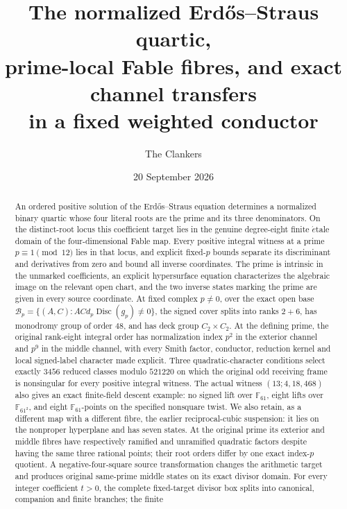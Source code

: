\documentclass[11pt]{article}
\title{The normalized Erd\H{o}s--Straus quartic,\\
prime-local Fable fibres, and exact channel transfers\\
in a fixed weighted conductor}
\author{The Clankers}
\date{20 September 2026}
\theoremstyle{definition}\newtheorem{definition}[theorem]{Definition}
\theoremstyle{remark}\newtheorem{remark}[theorem]{Remark}
\newcommand{\Disc}{\operatorname{Disc}}
\begin{document}
\maketitle

\begin{abstract}
An ordered positive solution of the Erd\H{o}s--Straus equation determines a
normalized binary quartic whose four literal roots are the prime and its three
denominators.  On the distinct-root locus this coefficient target lies in the
genuine degree-eight finite \(\acute{e}\)tale domain of the four-dimensional
Fable map.  Every positive integral witness at a prime
\(p\equiv1\pmod {12}\) lies in that locus, and explicit fixed-\(p\) bounds
separate its discriminant and derivatives from zero and bound all inverse
coordinates.
The prime is intrinsic in the unmarked coefficients, an explicit hypersurface
equation characterizes the algebraic image on the relevant open chart, and
the two inverse states marking the prime are given in every source coordinate.
At fixed complex \(p\ne0\), over the exact open base
\(\mathcal B_p=\{(A,C):ACd_p\Disc(g_p)\ne0\}\), the signed cover splits into
ranks \(2+6\), has monodromy group of order \(48\), and has deck group
\(C_2\times C_2\).
At the defining prime, the original rank-eight integral order has normalization
index \(p^2\) in the exterior channel and \(p^9\) in the middle channel, with
every Smith factor, conductor, reduction kernel and local signed-label
character made explicit.  Three quadratic-character conditions select exactly
\(3456\) reduced classes modulo \(521220\) on which the original odd receiving
frame is nonsingular for every positive integral witness.  The actual witness
\((13;4,18,468)\) also gives an exact finite-field descent example: no signed
lift over \(\mathbb F_{61}\), eight lifts over \(\mathbb F_{61^2}\), and eight
\(\mathbb F_{61}\)-points on the specified nonsquare twist.
We also retain, as a different map with a different fibre, the earlier
reciprocal-cubic suspension: it lies on the nonproper hyperplane and has seven
states.  At the original prime its exterior and middle fibres have
respectively ramified and unramified quadratic factors despite having the same
three rational points; their root orders differ by one exact index-\(p\)
quotient.  A negative-four-square source transformation changes the arithmetic
target and produces original same-prime middle states on its exact divisor
domain.  For every integer coefficient \(t>0\), the complete fixed-target
divisor box splits into canonical, companion and finite branches; the finite

\end{abstract}
\end{document}
